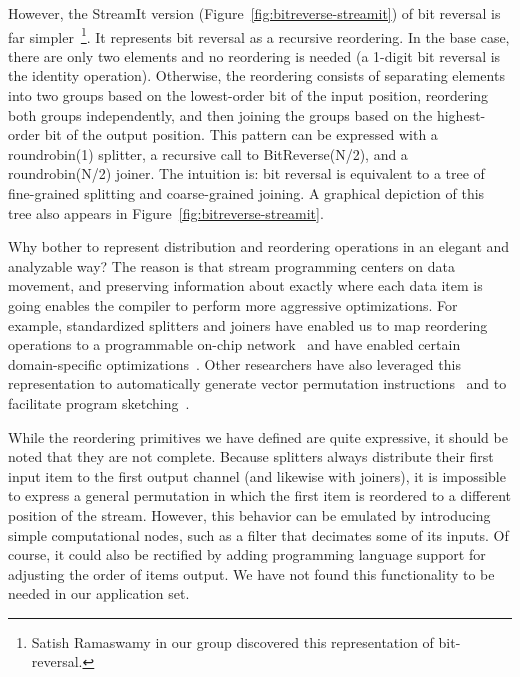 However, the StreamIt version (Figure~\ref{fig:bitreverse-streamit})
of bit reversal is far simpler~\footnote{Satish Ramaswamy in our group
  discovered this representation of bit-reversal.}.  It represents bit
reversal as a recursive reordering.  In the base case, there are only
two elements and no reordering is needed (a 1-digit bit reversal is
the identity operation).  Otherwise, the reordering consists of
separating elements into two groups based on the lowest-order bit of
the input position, reordering both groups independently, and then
joining the groups based on the highest-order bit of the output
position.  This pattern can be expressed with a roundrobin(1)
splitter, a recursive call to BitReverse(N/2), and a roundrobin(N/2)
joiner.  The intuition is: bit reversal is equivalent to a tree of
fine-grained splitting and coarse-grained joining.  A graphical
depiction of this tree also appears in
Figure~\ref{fig:bitreverse-streamit}.

Why bother to represent distribution and reordering operations in an
elegant and analyzable way?  The reason is that stream programming
centers on data movement, and preserving information about exactly
where each data item is going enables the compiler to perform more
aggressive optimizations.  For example, standardized splitters and
joiners have enabled us to map reordering operations to a programmable
on-chip network~\cite{streamit-asplos} and have enabled certain
domain-specific
optimizations~\cite{lamb-pldi03,agrawal-cases05,techreport}.
Other researchers have also leveraged this representation to
automatically generate vector permutation
instructions~\cite{mani-permutations} and to facilitate program
sketching~\cite{bit-streaming}.

While the reordering primitives we have defined are quite expressive,
it should be noted that they are not complete.  Because splitters
always distribute their first input item to the first output channel
(and likewise with joiners), it is impossible to express a general
permutation in which the first item is reordered to a different
position of the stream.  However, this behavior can be emulated by
introducing simple computational nodes, such as a filter that
decimates some of its inputs.  Of course, it could also be rectified
by adding programming language support for adjusting the order of
items output.  We have not found this functionality to be needed in
our application set.


